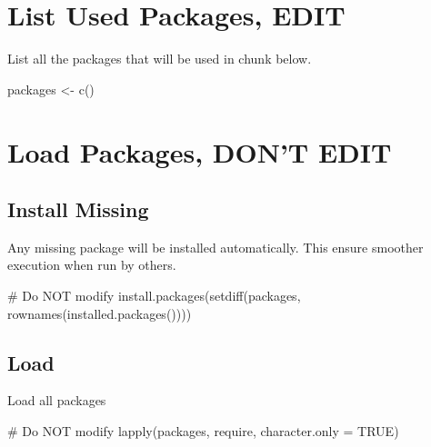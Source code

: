 \documentclass[
  letterpaper,
  DIV=11,
  numbers=noendperiod]{scrreprt}
\newenvironment{Shaded}{\begin{snugshade}}{\end{snugshade}}
\newcommand{\AttributeTok}[1]{\textcolor[rgb]{0.40,0.45,0.13}{#1}}
\newcommand{\CommentTok}[1]{\textcolor[rgb]{0.37,0.37,0.37}{#1}}
\newcommand{\ConstantTok}[1]{\textcolor[rgb]{0.56,0.35,0.01}{#1}}
\newcommand{\FunctionTok}[1]{\textcolor[rgb]{0.28,0.35,0.67}{#1}}
\newcommand{\NormalTok}[1]{\textcolor[rgb]{0.00,0.23,0.31}{#1}}
\newcommand{\OtherTok}[1]{\textcolor[rgb]{0.00,0.23,0.31}{#1}}
\begin{document}
\section*{List Used Packages, EDIT}\label{list-used-packages-edit-4}


List all the packages that will be used in chunk below.

\begin{Shaded}
\begin{Highlighting}[]
\NormalTok{packages }\OtherTok{\textless{}{-}} \FunctionTok{c}\NormalTok{()}
\end{Highlighting}
\end{Shaded}

\section*{Load Packages, DON'T EDIT}\label{sec-packages}


\subsection*{Install Missing}\label{install-missing-4}

Any missing package will be installed automatically. This ensure
smoother execution when run by others.

\begin{Shaded}
\begin{Highlighting}[]
\CommentTok{\# Do NOT modify}
\FunctionTok{install.packages}\NormalTok{(}\FunctionTok{setdiff}\NormalTok{(packages, }\FunctionTok{rownames}\NormalTok{(}\FunctionTok{installed.packages}\NormalTok{())))}
\end{Highlighting}
\end{Shaded}

\subsection*{Load}\label{load-4}

Load all packages

\begin{Shaded}
\begin{Highlighting}[]
\CommentTok{\# Do NOT modify}
\FunctionTok{lapply}\NormalTok{(packages, require, }\AttributeTok{character.only =} \ConstantTok{TRUE}\NormalTok{)}
\end{Highlighting}
\end{Shaded}
\end{document}
